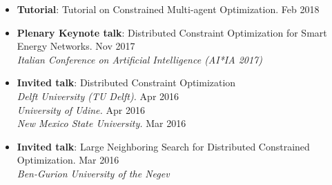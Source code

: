 \begin{itemize}





	\item {\bf Tutorial}: {Tutorial on Constrained Multi-agent Optimization.} \hfill {Feb 2018}\\
  	

	\item {\bf Plenary Keynote talk}: Distributed Constraint Optimization for Smart Energy Networks. \hfill {Nov 2017}\\
    {\em Italian Conference on Artificial Intelligence (AI*IA 2017)}
	

	\item {\bf Invited talk}: Distributed Constraint Optimization\\
	{\em Delft University (TU Delft).} \hfill {Apr 2016}\\
 	{\em University of Udine.} \hfill {Apr 2016} \\ 
	{\em New Mexico State University.} \hfill {Mar 2016}
	
	\item {\bf Invited talk}: Large Neighboring Search for Distributed Constrained Optimization. \hfill {Mar 2016}\\
	{\em Ben-Gurion University of the Negev}
\end{itemize}
